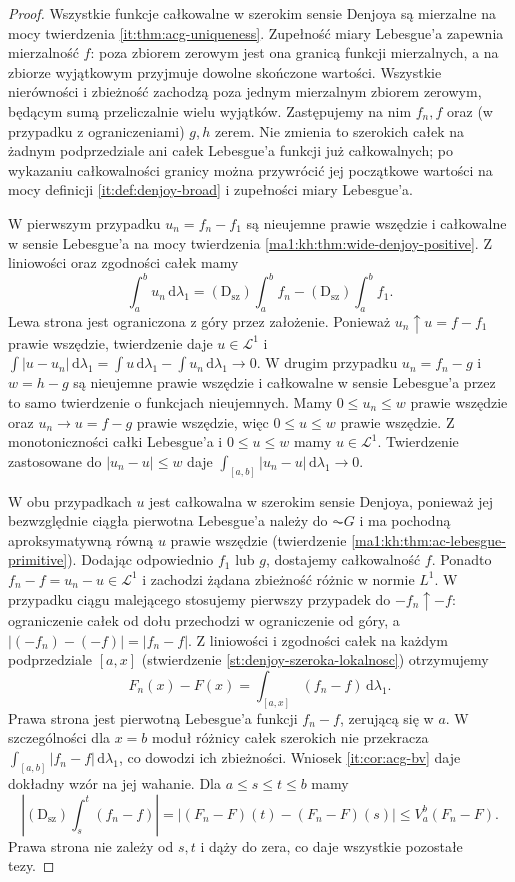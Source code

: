 \begin{proof}
Wszystkie funkcje całkowalne w szerokim sensie Denjoya
są mierzalne na mocy twierdzenia \ref{it:thm:acg-uniqueness}.
Zupełność miary Lebesgue'a zapewnia mierzalność $f$:
poza zbiorem zerowym jest ona granicą funkcji mierzalnych,
a na zbiorze wyjątkowym przyjmuje dowolne skończone wartości.
Wszystkie nierówności i zbieżność zachodzą poza jednym
mierzalnym zbiorem zerowym, będącym sumą przeliczalnie wielu wyjątków. Zastępujemy na nim $f_n,f$ oraz (w przypadku z ograniczeniami) $g,h$ zerem. Nie zmienia to szerokich całek na żadnym podprzedziale ani całek Lebesgue'a funkcji już całkowalnych; po wykazaniu całkowalności granicy można przywrócić jej początkowe wartości na mocy definicji \ref{it:def:denjoy-broad} i zupełności miary Lebesgue'a.

W pierwszym przypadku $u_n=f_n-f_1$ są nieujemne
prawie wszędzie i całkowalne w sensie Lebesgue'a na mocy
twierdzenia \ref{ma1:kh:thm:wide-denjoy-positive}.
Z liniowości oraz zgodności całek mamy
\[
 \int_a^b u_n\,\mathrm d\lambda_1
 =(\mathrm D_{\mathrm{sz}})\int_a^b f_n
 -(\mathrm D_{\mathrm{sz}})\int_a^b f_1.
\]
Lewa strona jest ograniczona z góry przez założenie.
Ponieważ $u_n\uparrow u=f-f_1$ prawie wszędzie, twierdzenie
 daje $u\in\mathcal L^1$ i
$\int |u-u_n|\,\mathrm d\lambda_1
=\int u\,\mathrm d\lambda_1-\int u_n\,\mathrm d\lambda_1\to0$.
W drugim przypadku $u_n=f_n-g$ i $w=h-g$ są nieujemne
prawie wszędzie i całkowalne w sensie Lebesgue'a przez to
samo twierdzenie o funkcjach nieujemnych. Mamy
$0\le u_n\le w$ prawie wszędzie oraz $u_n\to u=f-g$
prawie wszędzie, więc $0\le u\le w$ prawie wszędzie.
Z monotoniczności całki Lebesgue'a i $0\le u\le w$ mamy $u\in\mathcal L^1$. Twierdzenie  zastosowane do $|u_n-u|\le w$ daje $\int_{[a,b]}|u_n-u|\,\mathrm d\lambda_1\to0$.

W obu przypadkach $u$ jest całkowalna w szerokim sensie
Denjoya, ponieważ jej bezwzględnie ciągła pierwotna
Lebesgue'a należy do $\AC G$ i ma pochodną aproksymatywną
równą $u$ prawie wszędzie (twierdzenie
\ref{ma1:kh:thm:ac-lebesgue-primitive}). Dodając odpowiednio
$f_1$ lub $g$, dostajemy całkowalność $f$.
Ponadto $f_n-f=u_n-u\in\mathcal L^1$ i zachodzi
żądana zbieżność różnic w normie $L^1$. W przypadku ciągu malejącego stosujemy pierwszy przypadek do $-f_n\uparrow-f$: ograniczenie całek od dołu przechodzi w ograniczenie od góry, a $|(-f_n)-(-f)|=|f_n-f|$.
Z liniowości i zgodności całek na każdym
podprzedziale $[a,x]$ (stwierdzenie
\ref{st:denjoy-szeroka-lokalnosc}) otrzymujemy
\[
 F_n(x)-F(x)=\int_{[a,x]}(f_n-f)\,\mathrm d\lambda_1.
\]
Prawa strona jest pierwotną Lebesgue'a funkcji
$f_n-f$, zerującą się w $a$. W szczególności
dla $x=b$ moduł różnicy całek szerokich nie
przekracza $\int_{[a,b]}|f_n-f|\,\mathrm d\lambda_1$,
co dowodzi ich zbieżności. Wniosek \ref{it:cor:acg-bv}
daje dokładny wzór na jej wahanie.
Dla $a\le s\le t\le b$ mamy
\[
 \left|(\mathrm D_{\mathrm{sz}})\int_s^t(f_n-f)\right|
 =\left|(F_n-F)(t)-(F_n-F)(s)\right|
 \le V_a^b(F_n-F).
\]
Prawa strona nie zależy od $s,t$ i dąży do zera,
co daje wszystkie pozostałe tezy.
\end{proof}
